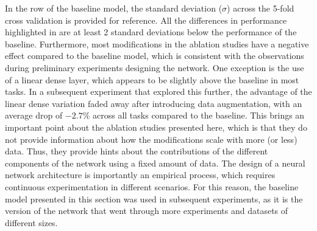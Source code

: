 In the row of the baseline model, the standard deviation
($\sigma$) across the 5-fold cross validation is provided
for reference. All the differences in performance
highlighted in  are at least 2 standard
deviations below the performance of the baseline.
Furthermore, most modifications in the ablation studies have
a negative effect compared to the baseline model, which is
consistent with the observations during preliminary
experiments designing the network. One exception is the use
of a linear dense layer, which appears to be slightly above
the baseline in most tasks. In a subsequent experiment that
explored this further, the advantage of the linear dense
variation faded away after introducing data augmentation,
with an average drop of $-2.7\%$ across all tasks compared
to the baseline. This brings an important point about the
ablation studies presented here, which is that they do not
provide information about how the modifications scale with
more (or less) data. Thus, they provide hints about the
contributions of the different components of the network
using a fixed amount of data. The design of a neural network
architecture is importantly an empirical process, which
requires continuous experimentation in different scenarios.
For this reason, the baseline model presented in this
section was used in subsequent experiments, as it is the
version of the network that went through more experiments
and datasets of different sizes.
